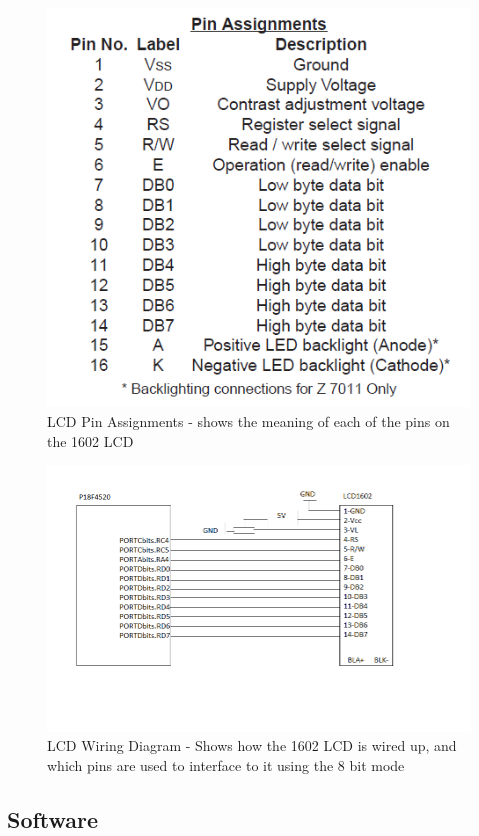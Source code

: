 \documentclass[]{report}
\begin{document}
\begin{figure}
\centering
\includegraphics[width=0.7\linewidth]{"../Diagrams/LCD Pin Assignments"}
\caption{LCD Pin Assignments - shows the meaning of each of the pins on the 1602 LCD}
\label{fig:LCDPinAssignments}
\end{figure}

\begin{figure}
\centering
\includegraphics[width=0.7\linewidth]{"../Diagrams/LCD Pin Wiring Diagram"}
\caption{LCD Wiring Diagram - Shows how the 1602 LCD is wired up, and which pins are used to interface to it using the 8 bit mode}
\label{fig:LCDPinWiringDiagram}
\end{figure}

\subsection{Software}
\end{document}
